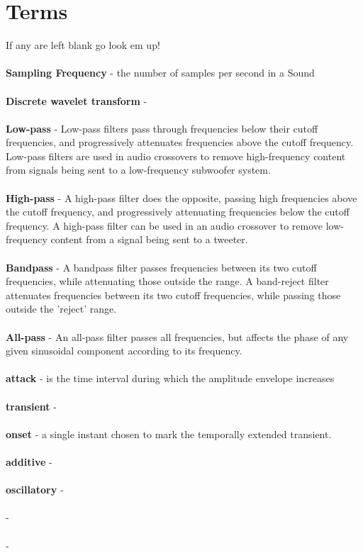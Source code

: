 \documentclass[a4paper]{article}
\begin{document}
    \section{Terms}
        If any are left blank go look em up!\\ \\
         \textbf{Sampling Frequency} - the number of samples per second in a Sound \\ \\
         \textbf{Discrete wavelet transform} - \\ \\
         \textbf{Low-pass} - Low-pass filters pass through frequencies below their cutoff frequencies, and progressively
          attenuates frequencies above the cutoff frequency. Low-pass filters are used in audio crossovers to remove
          high-frequency content from signals being sent to a low-frequency subwoofer system.\\ \\
         \textbf{High-pass} - A high-pass filter does the opposite, passing high frequencies above the cutoff frequency,
          and progressively attenuating frequencies below the cutoff frequency. A high-pass filter can be used in an
          audio crossover to remove low-frequency content from a signal being sent to a tweeter.\\ \\
         \textbf{Bandpass} - A bandpass filter passes frequencies between its two cutoff frequencies, while attenuating
          those outside the range. A band-reject filter attenuates frequencies between its two cutoff frequencies,
          while passing those outside the 'reject' range.\\ \\
         \textbf{All-pass} - An all-pass filter passes all frequencies, but affects the phase of any given sinusoidal
         component according to its frequency.\\ \\
         \textbf{attack} -  is the time interval during which the amplitude envelope increases\\ \\
         \textbf{transient} -  \\ \\
         \textbf{onset} - a single instant chosen to mark the temporally extended transient. \\ \\
         \textbf{additive} -  \\ \\
         \textbf{oscillatory} -  \\ \\
         \textbf{} -  \\ \\
         \textbf{} -  \\ \\
\end{document}
